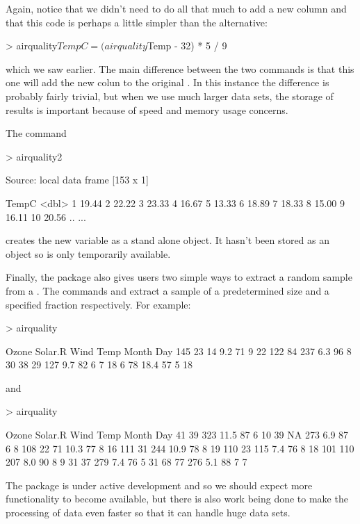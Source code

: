 Again, notice that we didn't need to do all that much to add a new column and that this code is perhaps a little simpler than the alternative: 
\begin{Schunk}
\begin{Sinput}
> airquality$TempC = (airquality$Temp - 32) * 5 / 9 
\end{Sinput}
\end{Schunk}
which we saw earlier. The main difference between the two commands is that this one will add the new colun to the original . 
In this instance the difference is probably fairly trivial, but when we use much larger data sets, the storage of results is important because of speed and memory usage concerns. 
 
The command 
\begin{Schunk}
\begin{Sinput}
> airquality2 %>% transmute(TempC = (Temp - 32) * 5 / 9) 
\end{Sinput}
\begin{Soutput}
Source: local data frame [153 x 1]

   TempC
   <dbl>
1  19.44
2  22.22
3  23.33
4  16.67
5  13.33
6  18.89
7  18.33
8  15.00
9  16.11
10 20.56
..   ...
\end{Soutput}
\end{Schunk}
creates the new variable as a stand alone object. It hasn't been stored as an object so is only temporarily available.  
 
Finally, the  package also gives users two simple ways to extract a random sample from a . The commands  and   
extract a sample of a predetermined size and a specified fraction respectively. For example: 
\begin{Schunk}
\begin{Sinput}
> airquality %>% sample_n(4) 
\end{Sinput}
\begin{Soutput}
    Ozone Solar.R Wind Temp Month Day
145    23      14  9.2   71     9  22
122    84     237  6.3   96     8  30
38     29     127  9.7   82     6   7
18      6      78 18.4   57     5  18
\end{Soutput}
\end{Schunk}
and 
\begin{Schunk}
\begin{Sinput}
> airquality %>% sample_frac(0.05) 
\end{Sinput}
\begin{Soutput}
    Ozone Solar.R Wind Temp Month Day
41     39     323 11.5   87     6  10
39     NA     273  6.9   87     6   8
108    22      71 10.3   77     8  16
111    31     244 10.9   78     8  19
110    23     115  7.4   76     8  18
101   110     207  8.0   90     8   9
31     37     279  7.4   76     5  31
68     77     276  5.1   88     7   7
\end{Soutput}
\end{Schunk}
 
The   package is under active development and so we should expect more functionality to become available, but there is also work being done to make the processing of data even faster so that it can handle huge data sets. 
 

